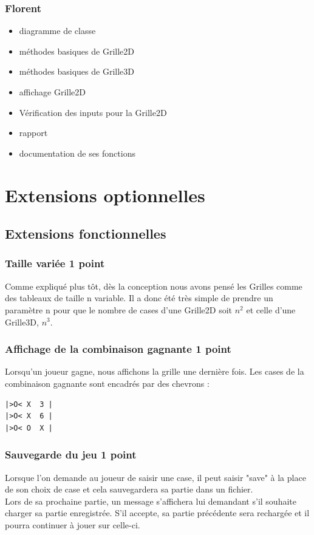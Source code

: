 \documentclass{article}
\begin{document}
\subsubsection{Florent}
 \begin{itemize}
    \item diagramme de classe
    \item méthodes basiques de Grille2D
    \item méthodes basiques de Grille3D
    \item affichage Grille2D
    \item Vérification des inputs pour la Grille2D
    \item rapport
    \item documentation de ses fonctions
\end{itemize}


\section{Extensions optionnelles}

\subsection{Extensions fonctionnelles}
\subsubsection{Taille variée \hfill 1 point}
Comme expliqué plus tôt, dès la conception nous avons pensé les Grilles comme des tableaux de taille n variable. Il a donc été très simple de prendre un paramètre n pour que le nombre de cases d’une Grille2D soit $n^{2}$ et celle d’une Grille3D, $n^{3}$.\\

\subsubsection{Affichage de la combinaison gagnante \hfill 1 point}
Lorsqu’un joueur gagne, nous affichons la grille une dernière fois. Les cases de la combinaison gagnante sont encadrés par des chevrons :
\begin{verbatim}
|>O< X  3 |
|>O< X  6 |
|>O< O  X |
\end{verbatim}

\subsubsection{Sauvegarde du jeu \hfill 1 point}
Lorsque l'on demande au joueur de saisir une case, il peut saisir "save" à la place de son choix de case et cela sauvegardera sa partie dans un fichier.\\ 
Lors de sa prochaine partie, un message s'affichera lui demandant s'il souhaite charger sa partie enregistrée. S'il accepte, sa partie précédente sera rechargée et il pourra continuer à jouer sur celle-ci.\\
\end{document}
